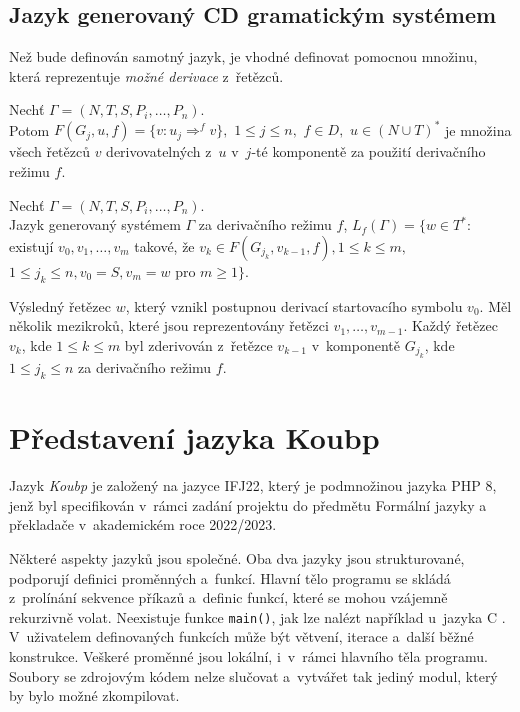 \section{Jazyk generovaný CD gramatickým systémem}
Než bude definován samotný jazyk, je vhodné definovat pomocnou množinu, která reprezentuje \emph{možné derivace} z~řetězců.
\begin{definition}\label{def_mozne_derivace}
    Nechť $\Gamma = (N, T, S, P_i, \ldots, P_n)$. \\  
    Potom $F(G_j,u,f)=\{v:u_j\Rightarrow^{f}v\},$ $1 \leq j \leq n,$ $f\in D,$ $u\in (N \cup T)^{*}$ je množina všech řetězců $v$ derivovatelných z~$u$ v~$j$-té komponentě za použití derivačního režimu $f$.
\end{definition}
\begin{definition}\label{def_generovany_jazyk}
    Nechť $\Gamma = (N, T, S, P_i, \ldots, P_n)$. \\  
    Jazyk generovaný systémem $\Gamma$ za derivačního režimu $f$, $L_f(\Gamma) = \{ w \in T^*:$ existují $v_0, v_1,\ldots, v_m$ takové, že $v_k \in F(G_{j_{k}}, v_{k-1}, f), 1 \leq k \leq m,$ $1 \leq j_k \leq n, v_0 = S, v_m = w$ pro $m \geq 1\}$.  
\end{definition} 

Výsledný řetězec $w$, který vznikl postupnou derivací startovacího symbolu $v_0$.
Měl několik mezikroků, které jsou reprezentovány řetězci $v_1, \ldots, v_{m-1}$.
Každý řetězec $v_k$, kde $1 \leq k \leq m$ byl zderivován z~řetězce $v_{k-1}$ v~komponentě $G_{j_{k}}$, kde $1 \leq j_k \leq n$ za derivačního režimu $f$.


\chapter{Představení jazyka Koubp }\label{6_jazyk_koubp}
Jazyk \emph{Koubp} je založený na jazyce IFJ22, který je podmnožinou jazyka PHP 8, jenž byl specifikován v~rámci zadání projektu do předmětu Formální jazyky a překladače v~akademickém roce 2022/2023.

Některé aspekty jazyků jsou společné. 
Oba dva jazyky jsou strukturované, podporují definici proměnných a~funkcí.
Hlavní tělo programu se skládá z~prolínání sekvence příkazů a~definic funkcí, které se mohou vzájemně rekurzivně volat.
Neexistuje funkce \texttt{main()}, jak lze nalézt například u~jazyka C \cite{ISO-C-Standard}.
V~uživatelem definovaných funkcích může být větvení, iterace a~další běžné konstrukce.
Veškeré proměnné jsou lokální, i~v~rámci hlavního těla programu.
Soubory se zdrojovým kódem nelze slučovat a~vytvářet tak jediný modul, který by bylo možné zkompilovat.

